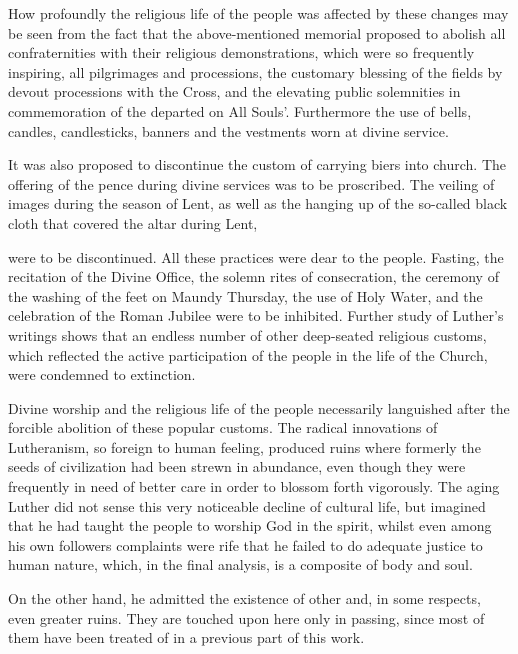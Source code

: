 How profoundly the religious life of the people was affected by these
changes may be seen from the fact that the above-mentioned memorial proposed
to abolish all confraternities with their religious demonstrations, which
were so frequently inspiring, all pilgrimages and processions, the customary
blessing of the fields by devout processions with the Cross, and the elevating
public solemnities in commemoration of the departed on All Souls’. Furthermore
the use of bells, candles, candlesticks, banners and the vestments worn
at divine service.

It was also proposed to discontinue the custom of carrying biers into
church. The offering of the pence during divine services was to be proscribed.
The veiling of images during the season of Lent, as well as the
hanging up of the so-called black cloth that covered the altar during Lent,

were to be discontinued. All these practices were dear to the people. Fasting,
the recitation of the Divine Office, the solemn rites of consecration, the
ceremony of the washing of the feet on Maundy Thursday, the use of Holy
Water, and the celebration of the Roman Jubilee were to be inhibited.
Further study of Luther’s writings shows that an endless number of other
deep-seated religious customs, which reflected the active participation of the
people in the life of the Church, were condemned to extinction.

Divine worship and the religious life of the people necessarily languished
after the forcible abolition of these popular customs. The
radical innovations of Lutheranism, so foreign to human feeling, produced
ruins where formerly the seeds of civilization had been strewn
in abundance, even though they were frequently in need of better
care in order to blossom forth vigorously. The aging Luther did not
sense this very noticeable decline of cultural life, but imagined that
he had taught the people to worship God in the spirit, whilst even
among his own followers complaints were rife that he failed to do
adequate justice to human nature, which, in the final analysis, is a
composite of body and soul.

On the other hand, he admitted the existence of other and, in some
respects, even greater ruins. They are touched upon here only in
passing, since most of them have been treated of in a previous part
of this work.

